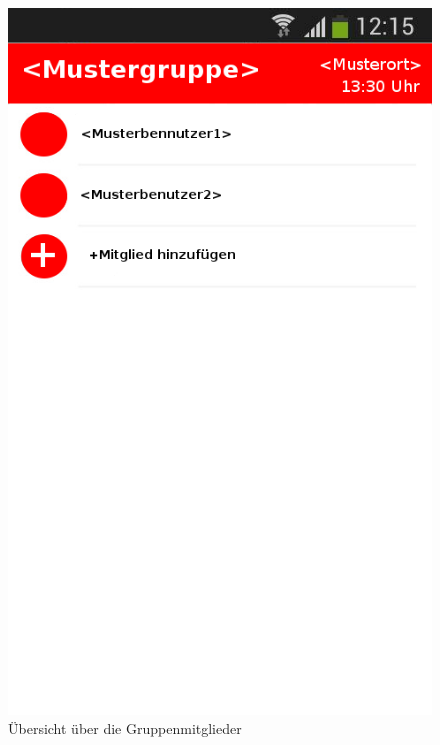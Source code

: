\begin{figure}
	\caption{Übersicht über die Gruppenmitglieder}
	\includegraphics[scale =0.5]{resources/images/gruppendetails_Admin.png}
\end{figure}

